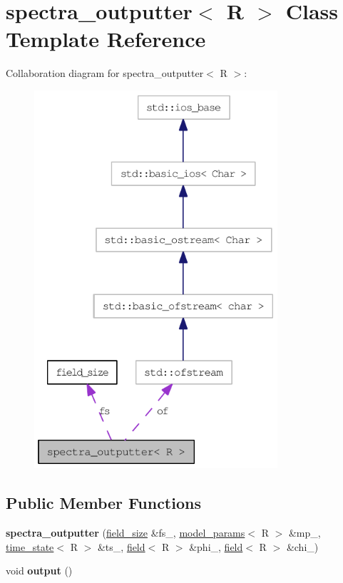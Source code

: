 \hypertarget{classspectra__outputter}{
\section{spectra\_\-outputter$<$ R $>$ Class Template Reference}
\label{classspectra__outputter}
}
Collaboration diagram for spectra\_\-outputter$<$ R $>$:\nopagebreak
\begin{figure}[H]
\begin{center}
\leavevmode
\includegraphics[width=256pt]{classspectra__outputter__coll__graph}
\end{center}
\end{figure}
\subsection*{Public Member Functions}
\begin{DoxyCompactItemize}
\item 
\hypertarget{classspectra__outputter_aa65c78886ac0787088268f9991bcf5dd}{
{\bfseries spectra\_\-outputter} (\hyperlink{structfield__size}{field\_\-size} \&fs\_\-, \hyperlink{structmodel__params}{model\_\-params}$<$ R $>$ \&mp\_\-, \hyperlink{structtime__state}{time\_\-state}$<$ R $>$ \&ts\_\-, \hyperlink{classfield}{field}$<$ R $>$ \&phi\_\-, \hyperlink{classfield}{field}$<$ R $>$ \&chi\_\-)}
\label{classspectra__outputter_aa65c78886ac0787088268f9991bcf5dd}

\item 
\hypertarget{classspectra__outputter_ad5d72a350a351d5b062c3778b32e66b8}{
void {\bfseries output} ()}
\label{classspectra__outputter_ad5d72a350a351d5b062c3778b32e66b8}

\end{DoxyCompactItemize}
